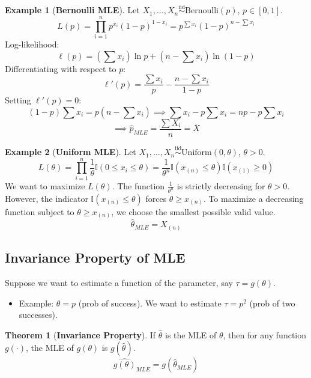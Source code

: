 \documentclass[12pt, a4paper]{article}
\theoremstyle{definition}
\newtheorem{example}{Example}
\newtheorem{theorem}{Theorem}
\newcommand{\iid}{\overset{\text{iid}}{\sim}}
\begin{document}
\begin{example}[\textbf{Bernoulli MLE}]
Let $X_1, \dots, X_n \iid \text{Bernoulli}(p)$, $p \in [0, 1]$.
$$ L(p) = \prod_{i=1}^n p^{x_i} (1-p)^{1-x_i} = p^{\sum x_i} (1-p)^{n-\sum x_i} $$
Log-likelihood:
$$ \ell(p) = \left(\sum x_i\right) \ln p + \left(n - \sum x_i\right) \ln (1-p) $$
Differentiating with respect to $p$:
$$ \ell'(p) = \frac{\sum x_i}{p} - \frac{n - \sum x_i}{1-p} $$
Setting $\ell'(p) = 0$:
$$ (1-p) \sum x_i = p(n - \sum x_i) \implies \sum x_i - p \sum x_i = np - p \sum x_i $$
$$ \implies \hat{p}_{MLE} = \frac{\sum X_i}{n} = \bar{X} $$
\end{example}

\begin{example}[\textbf{Uniform MLE}]
Let $X_1, \dots, X_n \iid \text{Uniform}(0, \theta)$, $\theta > 0$.
$$ L(\theta) = \prod_{i=1}^n \frac{1}{\theta} \mathbb{I}(0 \le x_i \le \theta) = \frac{1}{\theta^n} \mathbb{I}(x_{(n)} \le \theta) \mathbb{I}(x_{(1)} \ge 0) $$
We want to maximize $L(\theta)$.
The function $\frac{1}{\theta^n}$ is strictly decreasing for $\theta > 0$.
However, the indicator $\mathbb{I}(x_{(n)} \le \theta)$ forces $\theta \ge x_{(n)}$.
To maximize a decreasing function subject to $\theta \ge x_{(n)}$, we choose the smallest possible valid value.
$$ \hat{\theta}_{MLE} = X_{(n)} $$
\end{example}

\subsection{Invariance Property of MLE}
Suppose we want to estimate a function of the parameter, say $\tau = g(\theta)$.
\begin{itemize}
    \item Example: $\theta = p$ (prob of success). We want to estimate $\tau = p^2$ (prob of two successes).
\end{itemize}

\begin{theorem}[\textbf{Invariance Property}]
If $\hat{\theta}$ is the MLE of $\theta$, then for any function $g(\cdot)$, the MLE of $g(\theta)$ is $g(\hat{\theta})$.
$$ \widehat{g(\theta)}_{MLE} = g(\hat{\theta}_{MLE}) $$
\end{theorem}
\end{document}

